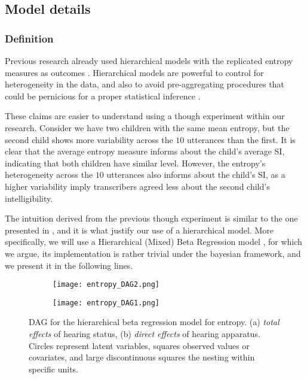 \subsection{Model details}

\subsubsection{Definition}
%
Previous research already used hierarchical models with the replicated entropy measures as outcomes \citep{Boonen_et_al_2021, Faes_et_al_2021}. Hierarchical models are powerful to control for heterogeneity in the data, and also to avoid pre-aggregating procedures that could be pernicious for a proper statistical inference \citep{McElreath_2020}. 

These claims are easier to understand using a though experiment within our research. Consider we have two children with the same mean entropy, but the second child shows more variability across the $10$ utterances than the first. It is clear that the average entropy measure informs about the child's average SI, indicating that both children have similar level. However, the entropy's heterogeneity across the $10$ utterances also informs about the child's SI, as a higher variability imply transcribers agreed less about the second child's intelligibility.

The intuition derived from the previous though experiment is similar to the one presented in \citet{Boonen_et_al_2021}, and it is what justify our use of a hierarchical model. More specifically, we will use a Hierarchical (Mixed) Beta Regression model \citep{Figueroa-Zuniga_et_al_2013}, for which we argue, its implementation is rather trivial under the bayesian framework, and we present it in the following lines.
%
\begin{figure}[h]
	\centering
	\begin{subfigure}{0.35\textwidth}
		\centering
		\texttt{[image: entropy\_DAG2.png]}
		\caption{}
	\end{subfigure}
	\hspace{0.1\textwidth}
	\begin{subfigure}{0.425\textwidth}
		\centering
		\texttt{[image: entropy\_DAG1.png]}
		\caption{}
	\end{subfigure}
	\caption[DAG for the hierarchical beta regression model for entropy.]%
	{DAG for the hierarchical beta regression model for entropy. (a) \textit{total effects} of hearing status, (b) \textit{direct effects} of hearing apparatus. Circles represent latent variables, squares observed values or covariates, and large discontinuous squares the nesting within specific units.}
	\label{fig:entropy_ME}
\end{figure}
%

